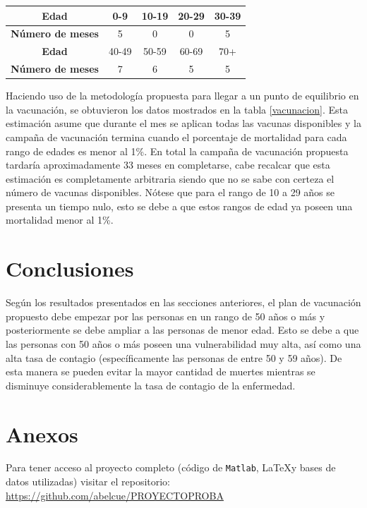 \documentclass[12pt,a4paper]{article}
\begin{document}
\begin{center}
\begin{tabular}{|c|c|c|c|c|}
\hline
\rowcolor[HTML]{C0C0C0} 
\textbf{Edad}                                    & 0-9   & 10-19 & 20-29 & 30-39 \\ \hline
\cellcolor[HTML]{C0C0C0}\textbf{Número de meses} & 5     & 0     & 0     & 5     \\ \hline
\rowcolor[HTML]{C0C0C0} 
\textbf{Edad}                                    & 40-49 & 50-59 & 60-69 & 70+   \\ \hline
\cellcolor[HTML]{C0C0C0}\textbf{Número de meses} & 7     & 6     & 5     & 5     \\ \hline
\end{tabular}
\end{center}

Haciendo uso de la metodología propuesta para llegar a un punto de equilibrio en la vacunación, se obtuvieron los datos mostrados en la tabla \ref{vacunacion}. Esta estimación asume que durante el mes se aplican todas las vacunas disponibles y la campaña de vacunación termina cuando el porcentaje de mortalidad para cada rango de edades es menor al 1\%. En total la campaña de vacunación propuesta tardaría aproximadamente 33 meses en completarse, cabe recalcar que esta estimación es completamente arbitraria siendo que no se sabe con certeza el número de vacunas disponibles. Nótese que para el rango de 10 a 29 años se presenta un tiempo nulo, esto se debe a que estos rangos de edad ya poseen una mortalidad menor al 1\%. 

\setlength{\parindent}{1cm}

\section{Conclusiones}
\setlength{\parindent}{0cm}
Según los resultados presentados en las secciones anteriores, el plan de vacunación propuesto debe empezar por las personas en un rango de 50 años o más y posteriormente se debe ampliar a las personas de menor edad. Esto se debe a que las personas con 50 años o más poseen una vulnerabilidad muy alta, así como una alta tasa de contagio (específicamente las personas de entre 50 y 59 años). De esta manera se pueden evitar la mayor cantidad de muertes mientras se disminuye considerablemente la tasa de contagio de la enfermedad.

\setlength{\parindent}{1cm}
\newpage



\section{Anexos}
\setlength{\parindent}{0cm}
Para tener acceso al proyecto completo (código de \texttt{Matlab}, \LaTeX y bases de datos utilizadas) visitar el repositorio:\\ \url{https://github.com/abelcue/PROYECTOPROBA}
\end{document}
